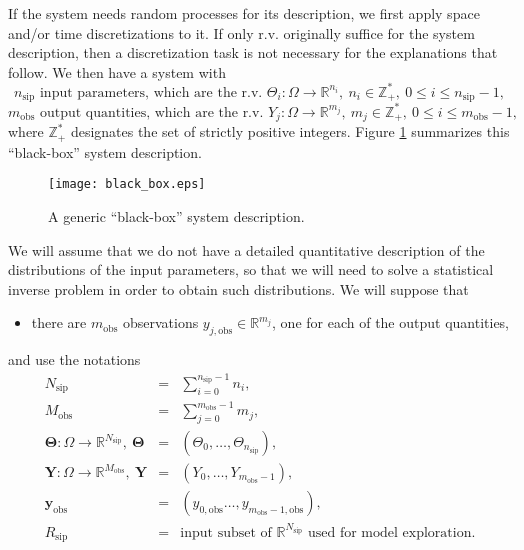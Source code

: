 If the system needs random processes for its description, we first apply space and/or time discretizations to it. 
If only r.v. originally suffice for the system description, then a discretization task is not necessary for the explanations that follow.
We then have a system with
\begin{equation}\label{eq-n-sip}
n_{\text{sip}}\text{ input parameters, which are the r.v. }\Theta_i:\Omega\rightarrow\mathbb{R}^{n_i},~n_i\in\mathbb{Z}_+^*,~0\leqslant i\leqslant n_{\text{sip}}-1,
\end{equation}
\begin{equation}\label{eq-m-obs}
m_{\text{obs}}\text{ output quantities, which are the r.v. }Y_j:\Omega\rightarrow\mathbb{R}^{m_j},~m_j\in\mathbb{Z}_+^*,~0\leqslant i\leqslant m_{\text{obs}}-1,
\end{equation}
where $\mathbb{Z}_+^*$ designates the set of strictly positive integers.
Figure \ref{fig-black-box} summarizes this ``black-box'' system description.

\begin{figure}%
\begin{center}
\texttt{[image: black\_box.eps]}
\end{center}
\caption{A generic ``black-box'' system description.
}
\label{fig-black-box}
\end{figure}

We will assume that we do not have a detailed quantitative description of the distributions of the input parameters, so that we will need to solve a statistical inverse problem
in order to obtain such distributions. 
We will suppose that
\begin{itemize}
\item there are $m_{\text{obs}}$ observations $y_{j,\text{obs}}\in\mathbb{R}^{m_j}$, one for each of the output quantities,
\end{itemize}
and use the notations
\begin{eqnarray*}
N_{\text{sip}}                                                                        & = & \sum_{i=0}^{n_{\text{sip}}-1}n_i,           \\
M_{\text{obs}}                                                                        & = & \sum_{j=0}^{m_{\text{obs}}       -1}m_j,    \\
\boldsymbol{\Theta}:\Omega\rightarrow\mathbb{R}^{N_{\text{sip}}},~\boldsymbol{\Theta} & = & (\Theta_0,\ldots,\Theta_{n_{\text{sip}}}),  \\ 
\mathbf{Y}:\Omega\rightarrow\mathbb{R}^{M_{\text{obs}}},~\mathbf{Y}                   & = & (Y_0,     \ldots,Y_{m_{\text{obs}}-1}    ), \\
\mathbf{y}_{\text{obs}}                                                               & = & (y_{0,\text{obs}}\ldots,y_{m_{\text{obs}}-1,\text{obs}}), \\
R_{\text{sip}}                                                                        & = & \text{input subset of }\mathbb{R}^{N_{\text{sip}}}\text{ used for model exploration}.
\end{eqnarray*}


